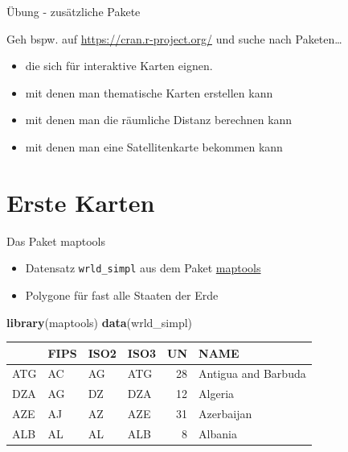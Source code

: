 \documentclass[ignorenonframetext,]{beamer}
\newenvironment{Shaded}{\begin{snugshade}}{\end{snugshade}}
\newcommand{\KeywordTok}[1]{\textcolor[rgb]{0.26,0.66,0.93}{\textbf{#1}}}
\newcommand{\NormalTok}[1]{\textcolor[rgb]{0.74,0.68,0.62}{#1}}
\providecommand{\tightlist}{%
  \setlength{\itemsep}{0pt}\setlength{\parskip}{0pt}}
\begin{document}
\begin{frame}{Übung - zusätzliche Pakete}

Geh bspw. auf \url{https://cran.r-project.org/} und suche nach
Paketen\ldots{}

\begin{itemize}
\tightlist
\item
  die sich für interaktive Karten eignen.
\item
  mit denen man thematische Karten erstellen kann
\item
  mit denen man die räumliche Distanz berechnen kann
\item
  mit denen man eine Satellitenkarte bekommen kann
\end{itemize}

\end{frame}

\section{Erste Karten}\label{erste-karten}

\begin{frame}[fragile]{Das Paket maptools}

\begin{itemize}
\tightlist
\item
  Datensatz \texttt{wrld\_simpl} aus dem Paket
  \href{https://cran.r-project.org/web/packages/maptools/index.html}{maptools}
\item
  Polygone für fast alle Staaten der Erde
\end{itemize}

\begin{Shaded}
\begin{Highlighting}[]
\KeywordTok{library}\NormalTok{(maptools)}
\KeywordTok{data}\NormalTok{(wrld_simpl)}
\end{Highlighting}
\end{Shaded}

\begin{longtable}[]{@{}llllrl@{}}
\toprule
& FIPS & ISO2 & ISO3 & UN & NAME\tabularnewline
\midrule
\endhead
ATG & AC & AG & ATG & 28 & Antigua and Barbuda\tabularnewline
DZA & AG & DZ & DZA & 12 & Algeria\tabularnewline
AZE & AJ & AZ & AZE & 31 & Azerbaijan\tabularnewline
ALB & AL & AL & ALB & 8 & Albania\tabularnewline
\bottomrule
\end{longtable}

\end{frame}
\end{document}
